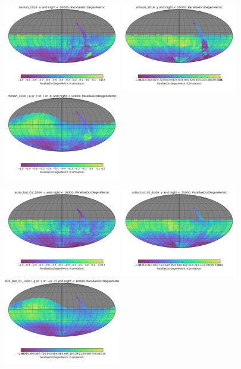 \begin{figure}[ht]
  \begin{center}
  \includegraphics[width=2.0in]{./figs/milkyway/astromPanels/MW_Astrom_paDcrDegen_Baseline_u_map.png}
  \includegraphics[width=2.0in]{./figs/milkyway/astromPanels/MW_Astrom_paDcrDegen_Baseline_y_map.png}
  \includegraphics[width=2.0in]{./figs/milkyway/astromPanels/MW_Astrom_paDcrDegen_Baseline_10y_map.png}
  \end{center}
  \begin{center}
  \includegraphics[width=2.0in]{./figs/milkyway/astromPanels/MW_Astrom_paDcrDegen_wfdPlane_u_map.png}
  \includegraphics[width=2.0in]{./figs/milkyway/astromPanels/MW_Astrom_paDcrDegen_wfdPlane_y_map.png}
  \includegraphics[width=2.0in]{./figs/milkyway/astromPanels/MW_Astrom_paDcrDegen_wfdPlane_10y_map.png}
  \end{center}


\end{figure}
